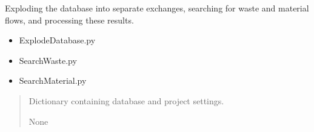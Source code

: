 \documentclass[letterpaper,10pt,english]{sphinxmanual}
\begin{document}

\begin{fulllineitems}
\label{\detokenize{WasteAndMaterialFootprint:WasteAndMaterialFootprint.main.ExplodeAndSearch}}
\pysigstartsignatures
{}
\pysigstopsignatures
\sphinxAtStartPar
Exploding the database into separate exchanges, searching for waste and
material flows, and processing these results.
\begin{description}
\begin{itemize}
\item {} 
\sphinxAtStartPar
ExplodeDatabase.py

\item {} 
\sphinxAtStartPar
SearchWaste.py

\item {} 
\sphinxAtStartPar
SearchMaterial.py

\end{itemize}

\end{description}
\begin{quote}\begin{description}
\sphinxAtStartPar
{} \textendash{} Dictionary containing database and project settings.

\sphinxAtStartPar
None

\end{description}\end{quote}

\end{fulllineitems}

\end{document}
